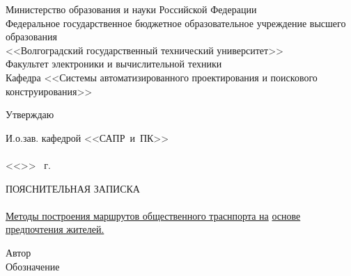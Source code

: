 \begin{titlepage}
    \begin{center}
        Министерство образования и науки Российской Федерации \\
        Федеральное государственное бюджетное образовательное учреждение высшего образования\\
        <<Волгоградский государственный технический университет>>\\
        Факультет электроники и вычислительной техники\\
        Кафедра <<Системы автоматизированного проектирования и поискового конструирования>>
    \end{center}
    \begin{flushright}
        \begin{center}
            \hspace*{9.7em}Утверждаю
        \end{center}
        И.о.зав. кафедрой <<САПР~и~ПК>>\\
        \hspace{0.5em}\\
        \vspace{0.5em}<<\underline{\hspace{2.5em}}>> \underline{\hspace{8.5em}} \the\year\ г.
    \end{flushright}
    \begin{center}
        \large ПОЯСНИТЕЛЬНАЯ ЗАПИСКА\\
            {}\\
        \underline{Методы построения маршрутов общественного траснпорта на\hspace{1.3em}}
        \underline{основе предпочтения жителей.\hspace{0.525\textwidth}}
    \end{center}
    Автор  \quad 
    \\
    Обозначение \UNDER{\underline{\smash{\hspace{6em}\MASTERWORK\hspace{9.2em}}}}

\end{titlepage}

